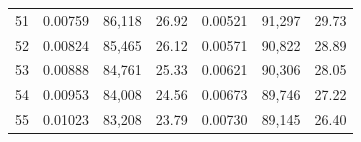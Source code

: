 \begin{tabular}{cccc|ccc}
51   & 0.00759                                                          & 86,118                                                                                            & 26.92                                                                                                                      & 0.00521                                                          & 91,297                                                                                            & 29.73                                                                                                                      \\
52   & 0.00824                                                          & 85,465                                                                                            & 26.12                                                                                                                      & 0.00571                                                          & 90,822                                                                                            & 28.89                                                                                                                      \\
53   & 0.00888                                                          & 84,761                                                                                            & 25.33                                                                                                                      & 0.00621                                                          & 90,306                                                                                            & 28.05                                                                                                                      \\
54   & 0.00953                                                          & 84,008                                                                                            & 24.56                                                                                                                      & 0.00673                                                          & 89,746                                                                                            & 27.22                                                                                                                      \\
55   & 0.01023                                                          & 83,208                                                                                            & 23.79                                                                                                                      & 0.00730                                                          & 89,145                                                                                            & 26.40                                                                                                                      \\

\end{tabular}
